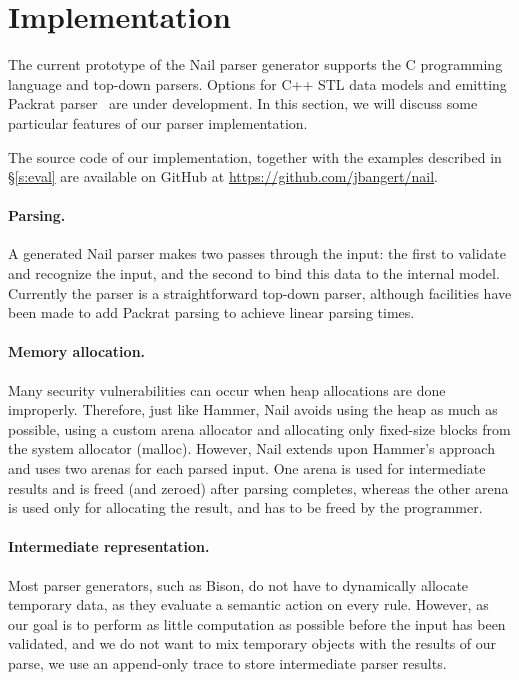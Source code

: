 \section{Implementation}
\label{s:impl}

The current prototype of the Nail parser generator supports the C programming
language and top-down parsers. Options for C++ STL data models and emitting
Packrat parser~\cite{packrat-parsing:icfp02} are under development. In
this section, we will discuss some particular features of our parser
implementation.

The source code of our implementation, together with the examples described in
\S\ref{s:eval} are available on GitHub at \url{https://github.com/jbangert/nail}.

\paragraph{Parsing.}

A generated Nail parser makes two passes through the input: the first to
validate and recognize the input, and the second to bind this data to the internal
model. Currently the parser is a straightforward top-down parser, although
facilities have been made to add Packrat parsing to achieve linear parsing
times.

\paragraph{Memory allocation.}

Many security vulnerabilities can occur when heap allocations are done
improperly. Therefore, just like Hammer, Nail avoids using the heap as much as
possible, using a custom arena allocator and allocating only fixed-size blocks
from the system allocator (malloc). However, Nail extends upon Hammer's approach and uses two
arenas for each parsed input. One arena is used for intermediate results and is
freed (and zeroed) after parsing completes, whereas the other arena is used only
for allocating the result, and has to be freed by the programmer.

\paragraph{Intermediate representation.}

Most parser generators, such as Bison, do not have to dynamically allocate
temporary data, as they evaluate a semantic action on every rule. However, as
our goal is to perform as little computation as possible before the input
has been validated, and we do not want to mix temporary objects with the
results of our parse, we use an append-only trace to store intermediate parser
results. 

